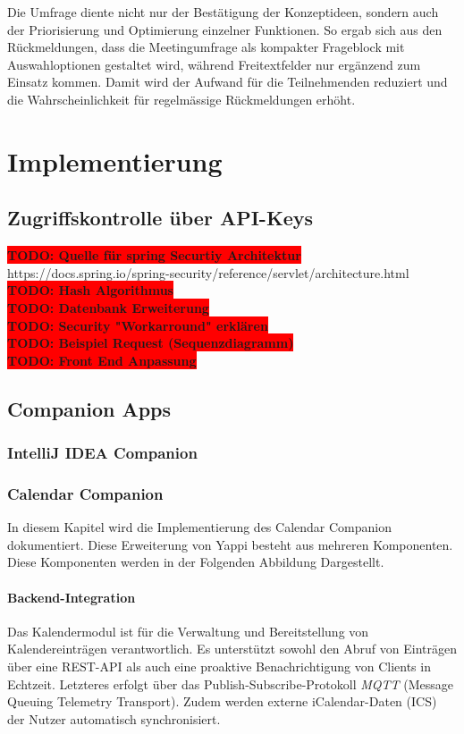 \documentclass[12pt,a4paper]{report}
\newcommand{\todo}[1]{\colorbox{red}{\textbf{TODO: #1}}\\}
\begin{document}
Die Umfrage diente nicht nur der Bestätigung der Konzeptideen, sondern auch der Priorisierung und Optimierung einzelner Funktionen.
So ergab sich aus den Rückmeldungen, dass die Meetingumfrage als kompakter Frageblock mit Auswahloptionen gestaltet wird,
während Freitextfelder nur ergänzend zum Einsatz kommen.
Damit wird der Aufwand für die Teilnehmenden reduziert und die Wahrscheinlichkeit für regelmässige Rückmeldungen erhöht.

\chapter{Implementierung}
\section{Zugriffskontrolle über API-Keys}

\todo{Quelle für spring Securtiy Architektur}
https://docs.spring.io/spring-security/reference/servlet/architecture.html
\todo{Hash Algorithmus}
\todo{Datenbank Erweiterung}
\todo{Security "Workarround" erklären}
\todo{Beispiel Request (Sequenzdiagramm)}
\todo{Front End Anpassung}

\section{Companion Apps}
\subsection{IntelliJ IDEA Companion}


\subsection{Calendar Companion}
    In diesem Kapitel wird die Implementierung des Calendar Companion dokumentiert.
    Diese Erweiterung von Yappi besteht aus mehreren Komponenten. Diese Komponenten werden in der Folgenden Abbildung Dargestellt.

\subsubsection{Backend-Integration}

    Das Kalendermodul ist für die Verwaltung und Bereitstellung von Kalendereinträgen verantwortlich.
    Es unterstützt sowohl den Abruf von Einträgen über eine REST-API als auch eine proaktive Benachrichtigung von Clients in Echtzeit.
    Letzteres erfolgt über das Publish-Subscribe-Protokoll \textit{MQTT} (Message Queuing Telemetry Transport).
    Zudem werden externe iCalendar-Daten (ICS) der Nutzer automatisch synchronisiert.
\end{document}
